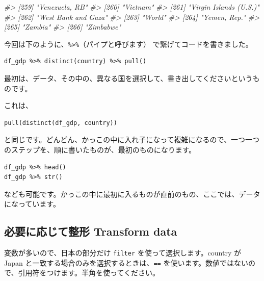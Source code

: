 \documentclass[
  xelatex, ja=standard]{bxjsbook}
\newenvironment{Shaded}{\begin{snugshade}}{\end{snugshade}}
\newcommand{\CommentTok}[1]{\textcolor[rgb]{0.56,0.35,0.01}{\textit{#1}}}
\theoremstyle{definition}
\theoremstyle{definition}
\theoremstyle{definition}
\theoremstyle{definition}
\theoremstyle{remark}
\begin{document}
\begin{Shaded}
\begin{Highlighting}[]
\CommentTok{\#\textgreater{} [259] "Venezuela, RB"                                       }
\CommentTok{\#\textgreater{} [260] "Vietnam"                                             }
\CommentTok{\#\textgreater{} [261] "Virgin Islands (U.S.)"                               }
\CommentTok{\#\textgreater{} [262] "West Bank and Gaza"                                  }
\CommentTok{\#\textgreater{} [263] "World"                                               }
\CommentTok{\#\textgreater{} [264] "Yemen, Rep."                                         }
\CommentTok{\#\textgreater{} [265] "Zambia"                                              }
\CommentTok{\#\textgreater{} [266] "Zimbabwe"}
\end{Highlighting}
\end{Shaded}

今回は下のように、\texttt{\%\textgreater{}\%}（パイプと呼びます） で繋げてコードを書きました。

\begin{verbatim}
df_gdp %>% distinct(country) %>% pull()
\end{verbatim}

最初は、データ、その中の、異なる国を選択して、書き出してくださいというものです。

これは、

\begin{verbatim}
pull(distinct(df_gdp, country))
\end{verbatim}

と同じです。どんどん、かっこの中に入れ子になって複雑になるので、一つ一つのステップを、順に書いたものが、最初のものになります。

\begin{verbatim}
df_gdp %>% head()
df_gdp %>% str()
\end{verbatim}

なども可能です。かっこの中に最初に入るものが直前のもの、ここでは、データになっています。

\hypertarget{ux5fc5ux8981ux306bux5fdcux3058ux3066ux6574ux5f62-transform-data}{%
\subsection{必要に応じて整形 Transform data}\label{ux5fc5ux8981ux306bux5fdcux3058ux3066ux6574ux5f62-transform-data}}

変数が多いので、日本の部分だけ \texttt{filter} を使って選択します。country が Japan と一致する場合のみを選択するときは、\texttt{==} を使います。数値ではないので、引用符をつけます。半角を使ってください。
\end{document}
